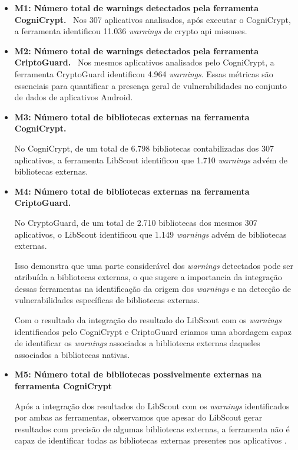 \begin{itemize}
\item \textbf{M1: Número total de warnings detectados pela ferramenta CogniCrypt.} \
Nos 307 aplicativos analisados, após executar o CogniCrypt, a ferramenta identificou 11.036 \textit{warnings} de crypto api missuses.

\item \textbf{M2: Número total de warnings detectados pela ferramenta CriptoGuard.} \
Nos mesmos aplicativos analisados pelo CogniCrypt, a ferramenta CryptoGuard identificou 4.964 \textit{warnings}. Essas métricas são essenciais para quantificar a presença geral de vulnerabilidades no conjunto de dados de aplicativos Android.


\item \textbf{M3: Número total de bibliotecas externas na ferramenta CogniCrypt.} \

No CogniCrypt, de um total de 6.798 bibliotecas contabilizadas dos 307 aplicativos, a ferramenta LibScout identificou que 1.710 \textit{warnings} advém de bibliotecas externas.

\item \textbf{M4: Número total de bibliotecas externas na ferramenta CriptoGuard.} \

No CryptoGuard, de um total de 2.710 bibliotecas dos mesmos 307 aplicativos, o LibScout identificou que 1.149 \textit{warnings} advém de bibliotecas externas. 

Isso demonstra que uma parte considerável dos \textit{warnings} detectados pode ser atribuída a bibliotecas externas, o que sugere a importancia da integração dessas ferramentas na identificação da origem dos \textit{warnings} e na detecção de vulnerabilidades específicas de bibliotecas externas.

Com o resultado da integração do resultado do LibScout com os \textit{warnings} identificados pelo CogniCrypt e CriptoGuard criamos uma abordagem capaz de identificar os \textit{warnings} associados a bibliotecas externas daqueles associados a bibliotecas nativas.

\item \textbf{M5: Número total de bibliotecas possivelmente externas na ferramenta CogniCrypt} \

Após a integração dos resultados do LibScout com os \textit{warnings} identificados por ambas as ferramentas, observamos que apesar do LibScout gerar resultados com precisão de algumas bibliotecas externas, a ferramenta não é capaz de identificar todas as bibliotecas externas presentes nos aplicativos \cite{api_tpl_zhang}.


\end{itemize}
